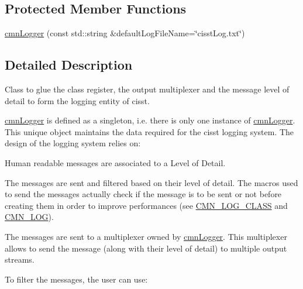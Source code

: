 \subsection*{Protected Member Functions}
\begin{DoxyCompactItemize}
\item 
\hyperlink{classcmn_logger_a5069a284c0793277466a6aa967ff41f8}{cmn\+Logger} (const std\+::string \&default\+Log\+File\+Name=\char`\"{}cisst\+Log.\+txt\char`\"{})
\end{DoxyCompactItemize}


\subsection{Detailed Description}
Class to glue the class register, the output multiplexer and the message level of detail to form the logging entity of cisst. 

\hyperlink{classcmn_logger}{cmn\+Logger} is defined as a singleton, i.\+e. there is only one instance of \hyperlink{classcmn_logger}{cmn\+Logger}. This unique object maintains the data required for the cisst logging system. The design of the logging system relies on\+:


\begin{DoxyItemize}
\item Human readable messages are associated to a Level of Detail.
\item The messages are sent and filtered based on their level of detail. The macros used to send the messages actually check if the message is to be sent or not before creating them in order to improve performances (see \hyperlink{cmn_logger_8h_a3fa9ee12c1a4d138c2594449aaf23729}{C\+M\+N\+\_\+\+L\+O\+G\+\_\+\+C\+L\+A\+S\+S} and \hyperlink{cmn_logger_8h_a2eb3b40558ec17c9ae45197777aca7b2}{C\+M\+N\+\_\+\+L\+O\+G}).
\item The messages are sent to a multiplexer owned by \hyperlink{classcmn_logger}{cmn\+Logger}. This multiplexer allows to send the message (along with their level of detail) to multiple output streams.
\end{DoxyItemize}

To filter the messages, the user can use\+:


